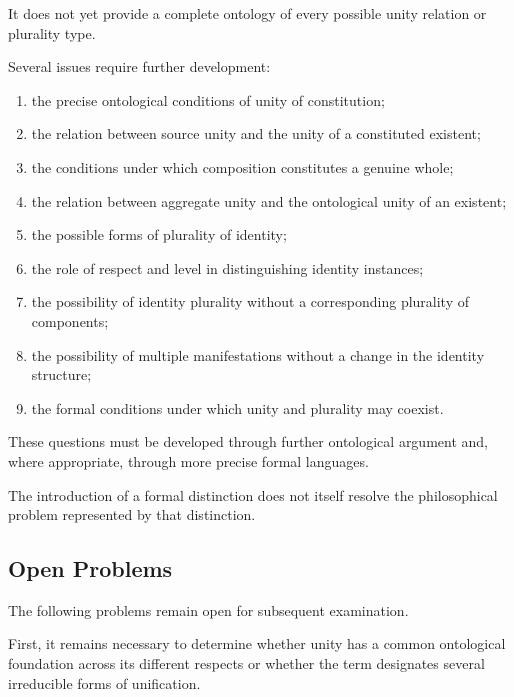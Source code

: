 It does not yet provide a
complete ontology of every
possible unity relation or
plurality type.

Several issues require further
development:

\begin{enumerate}
    \item the precise ontological
    conditions of unity of
    constitution;

    \item the relation between
    source unity and the unity
    of a constituted existent;

    \item the conditions under
    which composition constitutes
    a genuine whole;

    \item the relation between
    aggregate unity and the
    ontological unity of an
    existent;

    \item the possible forms
    of plurality of identity;

    \item the role of respect
    and level in distinguishing
    identity instances;

    \item the possibility of
    identity plurality without
    a corresponding plurality
    of components;

    \item the possibility of
    multiple manifestations
    without a change in the
    identity structure;

    \item the formal conditions
    under which unity and
    plurality may coexist.
\end{enumerate}

These questions must be developed
through further ontological
argument and, where appropriate,
through more precise formal
languages.

The introduction of a formal
distinction does not itself
resolve the philosophical
problem represented by that
distinction.

\subsection{Open Problems}

The following problems remain
open for subsequent examination.

First, it remains necessary
to determine whether unity
has a common ontological
foundation across its different
respects or whether the term
designates several irreducible
forms of unification.

